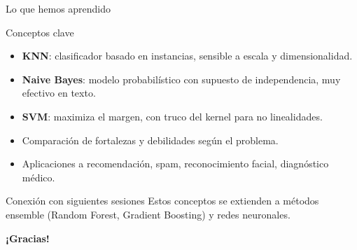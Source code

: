 \documentclass[aspectratio=169, 10pt, xcolor=table]{beamer}
\begin{document}
\begin{frame}{Lo que hemos aprendido}
    \begin{exampleblock}{Conceptos clave}
        \begin{itemize}
            \item \textbf{KNN}: clasificador basado en instancias, sensible a escala y dimensionalidad.
            \item \textbf{Naive Bayes}: modelo probabilístico con supuesto de independencia, muy efectivo en texto.
            \item \textbf{SVM}: maximiza el margen, con truco del kernel para no linealidades.
            \item Comparación de fortalezas y debilidades según el problema.
            \item Aplicaciones a recomendación, spam, reconocimiento facial, diagnóstico médico.
        \end{itemize}
    \end{exampleblock}
    \begin{block}{Conexión con siguientes sesiones}
        Estos conceptos se extienden a métodos ensemble (Random Forest, Gradient Boosting) y redes neuronales.
    \end{block}
\end{frame}

\begin{frame}
    \centering
    \Huge \textbf{¡Gracias!}

\end{frame}
\end{document}
